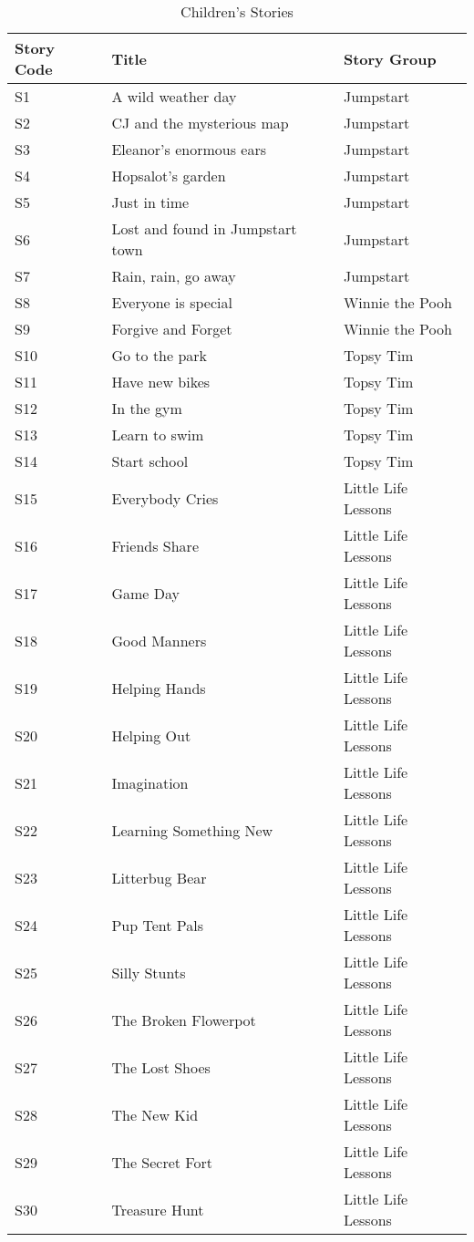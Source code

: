 \begin{table}[H]   %
\centering
\caption{Children's Stories} \vspace{0.25em}
\begin{tabular}{|p{2cm}|p{5cm}|p{4cm}|} \hline
\textbf{Story Code} & \textbf{Title} & \textbf{Story Group} \\ \hline
S1 & A wild weather day & Jumpstart \\ \hline
S2 & CJ and the mysterious map & Jumpstart \\ \hline
S3 & Eleanor's enormous ears & Jumpstart \\ \hline
S4 & Hopsalot's garden & Jumpstart \\ \hline
S5 & Just in time & Jumpstart \\ \hline
S6 & Lost and found in Jumpstart town & Jumpstart \\ \hline
S7 & Rain,  rain,  go away & Jumpstart \\ \hline
S8 & Everyone is special & Winnie the Pooh \\ \hline
S9 & Forgive and Forget & Winnie the Pooh \\ \hline
S10 & Go to the park & Topsy Tim \\ \hline
S11 & Have new bikes & Topsy Tim \\ \hline
S12 & In the gym & Topsy Tim \\ \hline
S13 & Learn to swim & Topsy Tim \\ \hline
S14 & Start school & Topsy Tim \\ \hline
S15 & Everybody Cries & Little Life Lessons \\ \hline
S16 & Friends Share & Little Life Lessons \\ \hline
S17 & Game Day & Little Life Lessons \\ \hline
S18 & Good Manners & Little Life Lessons \\ \hline
S19 & Helping Hands & Little Life Lessons \\ \hline
S20 & Helping Out & Little Life Lessons \\ \hline
S21 & Imagination & Little Life Lessons \\ \hline
S22 & Learning Something New & Little Life Lessons \\ \hline
S23 & Litterbug Bear & Little Life Lessons \\ \hline
S24 & Pup Tent Pals & Little Life Lessons \\ \hline
S25 & Silly Stunts & Little Life Lessons \\ \hline
S26 & The Broken Flowerpot & Little Life Lessons \\ \hline
S27 & The Lost Shoes & Little Life Lessons \\ \hline
S28 & The New Kid & Little Life Lessons \\ \hline
S29 & The Secret Fort & Little Life Lessons \\ \hline
S30 & Treasure Hunt & Little Life Lessons \\ \hline
\end{tabular}
\label{tab:stories}
\end{table}

